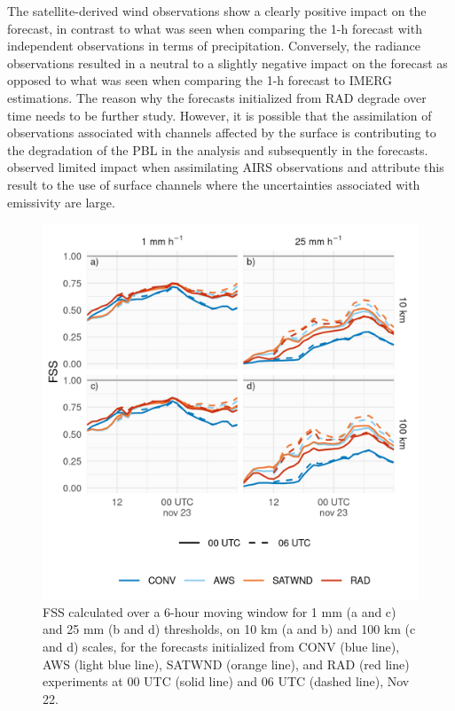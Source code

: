 \documentclass[preprint, 3p, authoryear,review, 12pt]{elsarticle} %
\begin{document}
The satellite-derived wind observations show a clearly positive impact on the forecast, in contrast to what was seen when comparing the 1-h forecast with independent observations in terms of precipitation. Conversely, the radiance observations resulted in a neutral to a slightly negative impact on the forecast as opposed to what was seen when comparing the 1-h forecast to IMERG estimations. The reason why the forecasts initialized from RAD degrade over time needs to be further study. However, it is possible that the assimilation of observations associated with channels affected by the surface is contributing to the degradation of the PBL in the analysis and subsequently in the forecasts. \citet{lim2014} observed limited impact when assimilating AIRS observations and attribute this result to the use of surface channels where the uncertainties associated with emissivity are large.



\begin{figure}
\centering
\includegraphics{../figures/fssfcst-1.png}
\caption{\label{fig:fssfcst}FSS calculated over a 6-hour moving window for 1 mm (a and c) and 25 mm (b and d) thresholds, on 10 km (a and b) and 100 km (c and d) scales, for the forecasts initialized from CONV (blue line), AWS (light blue line), SATWND (orange line), and RAD (red line) experiments at 00 UTC (solid line) and 06 UTC (dashed line), Nov 22.}
\end{figure}
\end{document}

